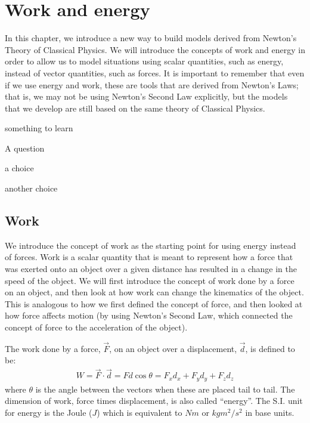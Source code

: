 
\chapter{Work and energy}
\label{chapter:workenergy}
In this chapter, we introduce a new way to build models derived from Newton's Theory of Classical Physics. We will introduce the concepts of work and energy in order to allow us to model situations using scalar quantities, such as energy, instead of vector quantities, such as forces. It is important to remember that even if we use energy and work, these are tools that are derived from Newton's Laws; that is, we may not be using Newton's Second Law explicitly, but the models that we develop are still based on the same theory of Classical Physics. 

\begin{learningObjectives}{
 \item something to learn
 }
\end{learningObjectives}

\begin{opening}
\begin{MCquestion}{A question}
\item a choice
\item another choice %
\end{MCquestion}
\end{opening}

\section{Work}
We introduce the concept of work as the starting point for using energy instead of forces. Work is a scalar quantity that is meant to represent how a force that was exerted onto an object over a given distance has resulted in a change in the speed of the object. We will first introduce the concept of work done by a force on an object, and then look at how work can change the kinematics of the object. This is analogous to how we first defined the concept of force, and then looked at how force affects motion (by using Newton's Second Law, which connected the concept of force to the acceleration of the object).

The work done by a force, $\vec F$, on an object over a displacement, $\vec d$, is defined to be:
\begin{align*}
W = \vec F \cdot \vec d = Fd\cos\theta = F_xd_x+F_yd_y+F_zd_z
\end{align*}
where $\theta$ is the angle between the vectors when these are placed tail to tail. The dimension of work, force times displacement, is also called ``energy''. The S.I. unit for energy is the Joule ($\si{J}$) which is equivalent to $\si{Nm}$ or $\si{kg m^2/s^2}$ in base units.

